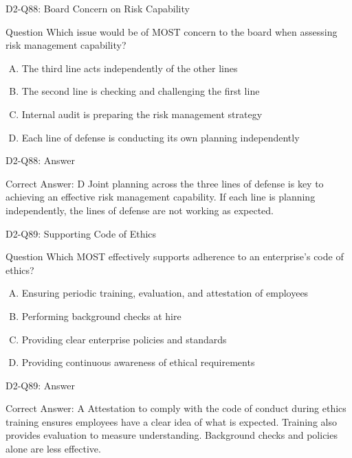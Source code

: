 \documentclass{beamer}
\begin{document}
	\begin{frame}{D2-Q88: Board Concern on Risk Capability}
		\begin{block}{Question}
			Which issue would be of MOST concern to the board when assessing risk management capability?
		\end{block}
		\begin{enumerate}[(A)]
			\item The third line acts independently of the other lines
			\item The second line is checking and challenging the first line
			\item Internal audit is preparing the risk management strategy
			\item Each line of defense is conducting its own planning independently
		\end{enumerate}
	\end{frame}
	\begin{frame}{D2-Q88: Answer}
		\begin{block}{Correct Answer: D}
			Joint planning across the three lines of defense is key to achieving an effective risk management capability. If each line is planning independently, the lines of defense are not working as expected.
		\end{block}
	\end{frame}
	
	\begin{frame}{D2-Q89: Supporting Code of Ethics}
		\begin{block}{Question}
			Which MOST effectively supports adherence to an enterprise's code of ethics?
		\end{block}
		\begin{enumerate}[(A)]
			\item Ensuring periodic training, evaluation, and attestation of employees
			\item Performing background checks at hire
			\item Providing clear enterprise policies and standards
			\item Providing continuous awareness of ethical requirements
		\end{enumerate}
	\end{frame}
	\begin{frame}{D2-Q89: Answer}
		\begin{block}{Correct Answer: A}
			Attestation to comply with the code of conduct during ethics training ensures employees have a clear idea of what is expected. Training also provides evaluation to measure understanding. Background checks and policies alone are less effective.
		\end{block}
	\end{frame}
	
\end{document}
